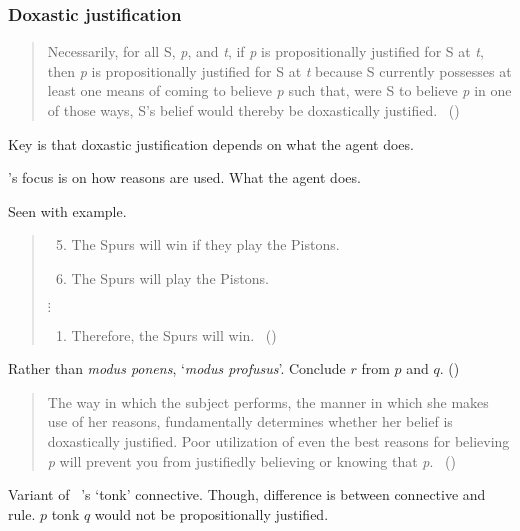\subsubsection{Doxastic justification}
\label{cha:fcs:sec:dox-just}

\begin{note}
  \citeauthor{Turri:2010aa}

  \begin{quote}
    Necessarily, for all S, \emph{p}, and \emph{t}, if \emph{p} is propositionally justified for S at \emph{t}, then \emph{p} is propositionally justified for S at \emph{t} because S currently possesses at least one means of coming to believe \emph{p} such that, were S to believe \emph{p} in one of those ways, S's belief would thereby be doxastically justified.%
    \mbox{ }\hfill\mbox{(\citeyear[316]{Turri:2010aa})}
  \end{quote}

  Key is that doxastic justification depends on what the agent does.

  \citeauthor{Turri:2010aa}'s focus is on how reasons are used.
  What the agent does.

  Seen with example.

  \begin{quote}
    \begin{enumerate}[label=(P\arabic*)]
      \setcounter{enumi}{4}
    \item
      The Spurs will win if they play the Pistons.
    \item
      The Spurs will play the Pistons.
    \end{enumerate}

    \mbox{}\hfill\(\vdots\)\hfill\mbox{}

    \begin{enumerate}[label=(P\arabic*), resume]
    \item
      Therefore, the Spurs will win.%
    \mbox{ }\hfill\mbox{(\citeyear[317]{Turri:2010aa})}
    \end{enumerate}
  \end{quote}

  Rather than \emph{modus ponens}, `\emph{modus profusus}'.
  Conclude \(r\) from \(p\) and \(q\).
  (\citeyear[317]{Turri:2010aa})

  \begin{quote}
    The way in which the subject performs, the manner in which she makes use of her reasons, fundamentally determines whether her belief is doxastically justified.
    Poor utilization of even the best reasons for believing \emph{p} will prevent you from justifiedly believing or knowing that \emph{p}.%
    \mbox{ }\hfill\mbox{(\citeyear[316]{Turri:2010aa})}
  \end{quote}

  Variant of ~\cite{Prior:1960wh}'s `tonk' connective.
  Though, difference is between connective and rule.
  \(p\) tonk \(q\) would not be propositionally justified.
\end{note}

